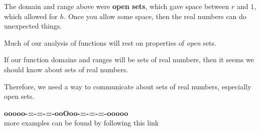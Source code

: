 \documentclass{ximera}
\begin{document}
The domain and range above were \textbf{\textcolor{purple!85!blue}{open sets}}, which gave space between $r$ and $1$, which allowed for $h$. Once you allow some space, then the real numbers can do unexpected things.

Much of our analysis of functions will rest on properties of \textit{open} sets. 


If our function domains and ranges will be sets of real numbers, then it seems we should know about sets of real numbers.

Therefore, we need a way to communicate about sets of real numbers, especially open sets.















\begin{onlineOnly}
\begin{center}
\textbf{\textcolor{green!50!black}{ooooo-=-=-=-ooOoo-=-=-=-ooooo}} \\

more examples can be found by following this link\\ 

\end{center}
\end{onlineOnly}
\end{document}
